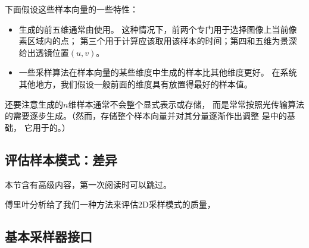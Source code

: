 下面假设这些样本向量的一些特性：
\begin{itemize}
    \item {}生成的前五维通常由使用。
    这种情况下，前两个专门用于选择图像上当前像素区域内的点；
    第三个用于计算应该取用该样本的时间；第四和五维为景深给出透镜位置$(u,v)$。
    \item 一些采样算法在样本向量的某些维度中生成的样本比其他维度更好。
    在系统其他地方，我们假设一般前面的维度具有放置得最好的样本值。
\end{itemize}

还要注意生成的$n$维样本通常不会整个显式表示或存储，
而是常常按照光传输算法的需要逐步生成。（然而，存储整个样本向量并对其分量逐渐作出调整
是中的基础，
它用于的。）

\subsection{评估样本模式：差异}\label{sub:评价样本模式：差异}
\begin{remark}
    本节含有高级内容，第一次阅读时可以跳过。
\end{remark}

傅里叶分析给了我们一种方法来评估2D采样模式的质量，

\subsection{基本采样器接口}\label{sub:基本采样器接口}

